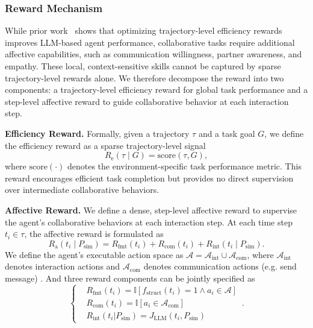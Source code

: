 \documentclass{article}
\theoremstyle{plain}
\theoremstyle{definition}
\theoremstyle{remark}
\begin{document}
\subsubsection{Reward Mechanism}\label{sec:reward}


While prior work~\cite{feng2025group,wang2025ragen,xi2025agentgymrl} shows that optimizing trajectory-level efficiency rewards improves LLM-based agent performance, collaborative tasks require additional affective capabilities, such as communication willingness, partner awareness, and empathy. These local, context-sensitive skills cannot be captured by sparse trajectory-level rewards alone. We therefore decompose the reward into two components: a trajectory-level efficiency reward for global task performance and a step-level affective reward to guide collaborative behavior at each interaction step.

\textbf{Efficiency Reward.} Formally, given a trajectory $\tau$ and a task goal $G$, we define the efficiency reward as a sparse trajectory-level signal
\begin{equation}
    R_{\text{e}}(\tau \mid G) = \text{score}(\tau, G),
\end{equation}
where $\text{score}(\cdot)$ denotes the environment-specific task performance metric. This reward encourages efficient task completion but provides no direct supervision over intermediate collaborative behaviors.

\textbf{Affective Reward.} We define a dense, step-level affective reward to supervise the agent’s collaborative behaviors at each interaction step. At each time step $t_i \in \tau$, the affective reward is formulated as
\begin{equation}
    R_{\text{a}}(t_i \mid P_{\text{sim}}) = R_{\text{fmt}}(t_i) + R_{\text{com}}(t_i) + R_{\text{int}}(t_i \mid P_{\text{sim}}).
\end{equation}
We define the agent’s executable action space as $\mathcal{A} =  \mathcal{A}_{\text{int}} \cup \mathcal{A}_{\text{com}}$, where $\mathcal{A}_{\text{int}}$ denotes interaction actions and $\mathcal{A}_{\text{com}}$ denotes communication actions (e.g. send message) . And three reward components can be jointly specified as
\begin{equation}
\left\{
    \begin{aligned}
    &R_{\text{fmt}}(t_i) = \mathbb{I}\left[f_{\text{struct}}(t_i) = 1 \wedge a_i \in \mathcal{A}\right] \\
    &R_{\text{com}}(t_i) = \mathbb{I}\left[a_i \in \mathcal{A}_{\text{com}}\right] \\
    &R_{\text{int}}(t_i|P_{\text{sim}}) = J_{\text{LLM}}\left(t_i, P_{\text{sim}}\right)
    \end{aligned} \,.
\right.
\end{equation}
\end{document}
